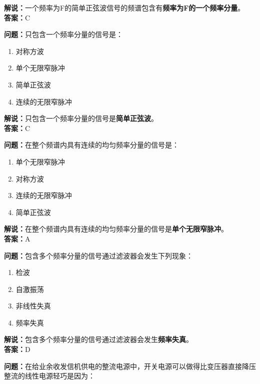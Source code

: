 \documentclass{ctexbook}
\begin{document}
\noindent\textbf{解说：}一个频率为F的简单正弦波信号的频谱包含有\textbf{频率为F的一个频率分量}。\\\noindent\textbf{答案：}C%


\bigskip


\noindent\textbf{问题：}只包含一个频率分量的信号是：
\begin{enumerate}[label=\Alph*), leftmargin=3em]
	\item 对称方波
	\item 单个无限窄脉冲
	\item 简单正弦波
	\item 连续的无限窄脉冲
\end{enumerate}

\noindent\textbf{解说：}只包含一个频率分量的信号是\textbf{简单正弦波}。\\\noindent\textbf{答案：}C%


\bigskip


\noindent\textbf{问题：}在整个频谱内具有连续的均匀频率分量的信号是：

\begin{enumerate}[label=\Alph*), leftmargin=3em]
	\item 单个无限窄脉冲
	\item 对称方波
	\item 连续的无限窄脉冲
	\item 简单正弦波
\end{enumerate}

\noindent\textbf{解说：}在整个频谱内具有连续的均匀频率分量的信号是\textbf{单个无限窄脉冲}。\\\noindent\textbf{答案：}A%


\bigskip


\noindent\textbf{问题：}包含多个频率分量的信号通过滤波器会发生下列现象：

\begin{enumerate}[label=\Alph*), leftmargin=3em]
	\item 检波
	\item 自激振荡
	\item 非线性失真
	\item 频率失真
\end{enumerate}

\noindent\textbf{解说：}包含多个频率分量的信号通过滤波器会发生\textbf{频率失真}。\\\noindent\textbf{答案：}D%


\bigskip


\noindent\textbf{问题：}在给业余收发信机供电的整流电源中，开关电源可以做得比变压器直接降压整流的线性电源轻巧是因为：
\end{document}
